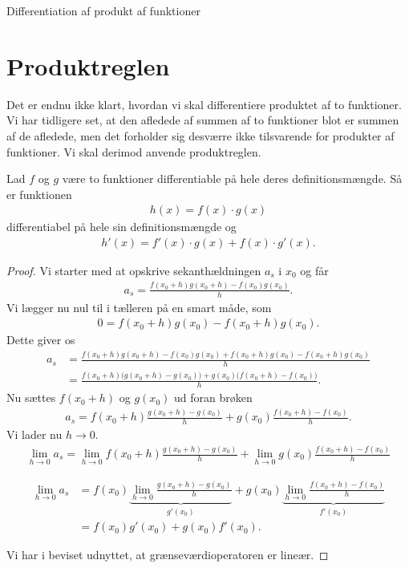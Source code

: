 \begin{center}
\Huge
Differentiation af produkt af funktioner
\end{center}


\section*{Produktreglen}

Det er endnu ikke klart, hvordan vi skal differentiere produktet af to funktioner. Vi har tidligere set, at den afledede af summen af to funktioner blot er summen af de afledede, men det forholder sig desværre ikke tilsvarende for produkter af funktioner. Vi skal derimod anvende produktreglen.
\begin{setn}[Produktreglen]
Lad $f$ og $g$ være to funktioner differentiable på hele deres definitionsmængde. Så er funktionen
\begin{align*}
	h(x) = f(x)\cdot g(x)
\end{align*}
differentiabel på hele sin definitionsmængde og 
\begin{align}\label{eq:produktregel}
	h'(x) = f'(x)\cdot g(x) + f(x)\cdot g'(x).
\end{align}
\end{setn}
\begin{proof}
Vi starter med at opskrive sekanthældningen $a_s$ i $x_0$ og får
\begin{align*}
	a_s = \frac{f(x_0 + h)g(x_0+h)-f(x_0)g(x_0)}{h}.
\end{align*}
Vi lægger nu nul til i tælleren på en smart måde, som
\begin{align*}
	0 = f(x_0 + h)g(x_0)-f(x_0+h)g(x_0).
\end{align*}
Dette giver os
\begin{align*}
	a_s &= \frac{f(x_0 + h)g(x_0+h)-f(x_0)g(x_0) + f(x_0 + h)g(x_0)-f(x_0 + h)g(x_0)}{h} \\
	&=\frac{f(x_0 + h)\big(g(x_0+h) - g(x_0)\big) + g(x_0)\big(f(x_0+h)-f(x_0) \big)}{h}.
\end{align*}
Nu sættes $f(x_0 +h)$ og $g(x_0)$ ud foran brøken
\begin{align*}
	a_s = f(x_0 + h)\frac{g(x_0 + h) - g(x_0)}{h} + g(x_0)\frac{f(x_0 + h)-f(x_0)}{h}.
\end{align*}
Vi lader nu $h \to 0$.
\begin{align*}
	\lim_{h \to 0} a_s = \lim_{h \to 0} f(x_0 + h)\frac{g(x_0 + h) - g(x_0)}{h} + \lim_{h \to 0} g(x_0)\frac{f(x_0 + h)-f(x_0)}{h}
\end{align*}

\begin{align*}
	\lim_{h \to 0} a_s &= f(x_0)\underbrace{\lim_{h \to 0}\frac{g(x_0 + h) - g(x_0)}{h}}_{g'(x_0)} + g(x_0)
	\underbrace{\lim_{h \to 0}\frac{f(x_0 + h)-f(x_0)}{h}}_{f'(x_0)}\\
	&=f(x_0)g'(x_0) + g(x_0)f'(x_0).
\end{align*}

Vi har i beviset udnyttet, at grænseværdioperatoren er lineær. 
\end{proof}

